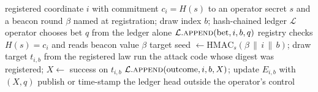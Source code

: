 \begin{algorithm}[t]
\caption{One committed audit draw}\label{alg:committed}
\begin{algorithmic}[1]
\Require registered coordinate $i$ with commitment $c_i=H(s)$ to an operator secret $s$
  and a beacon round $\beta$ named at registration; draw index $b$; hash-chained ledger $\mathcal L$
\State operator chooses bet $q$ from the ledger alone
\State $\mathcal L.\textsc{append}(\text{bet},i,b,q)$ 
\State registry checks $H(s)=c_i$ and reads beacon value $\beta$
\State target seed $\gets\mathrm{HMAC}_s(\beta\,\|\,i\,\|\,b)$; draw target $t_{i,b}$ from the registered law
\State run the attack code whose digest was registered; $X\gets$ success on $t_{i,b}$
\State $\mathcal L.\textsc{append}(\text{outcome},i,b,X)$; update $E_{i,b}$ with $(X,q)$
\State publish or time-stamp the ledger head outside the operator's control
\end{algorithmic}
\end{algorithm}
